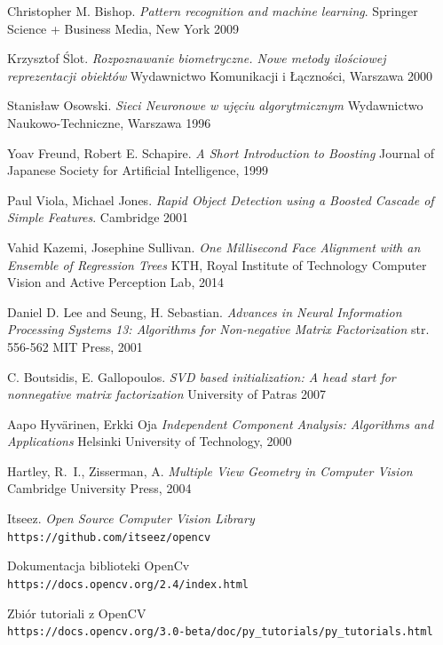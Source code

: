 \documentclass[oneside, eng]{mgr}
\begin{document}
\newpage
\begin{thebibliography}{9}

Christopher M. Bishop.
\textit{Pattern recognition and machine learning}.
Springer Science + Business Media, New York 2009

Krzysztof Ślot.
\textit{Rozpoznawanie biometryczne. Nowe metody ilościowej reprezentacji obiektów}
Wydawnictwo Komunikacji i Łączności, Warszawa 2000

Stanisław Osowski.
\textit{Sieci Neuronowe w ujęciu algorytmicznym}
Wydawnictwo Naukowo-Techniczne, Warszawa 1996

Yoav Freund, Robert E. Schapire.
\textit{A Short Introduction to Boosting}
Journal of Japanese Society for Artificial Intelligence, 1999

Paul Viola, Michael Jones.
\textit{Rapid Object Detection using a Boosted Cascade of Simple Features}.
Cambridge 2001

Vahid Kazemi, Josephine Sullivan.
\textit{One Millisecond Face Alignment with an Ensemble of Regression Trees}
KTH, Royal Institute of Technology
Computer Vision and Active Perception Lab, 2014

Daniel D. Lee and Seung, H. Sebastian.
\textit{Advances in Neural Information Processing Systems 13: Algorithms for Non-negative Matrix Factorization}
str. 556-562
MIT Press, 2001

C. Boutsidis, E. Gallopoulos.
\textit{SVD based initialization: A head start for nonnegative matrix factorization}
University of Patras 2007

Aapo Hyvärinen, Erkki Oja
\textit{Independent Component Analysis: Algorithms and Applications}
Helsinki University of Technology, 2000

Hartley, R.~I., Zisserman, A.
\textit{Multiple View Geometry in Computer Vision}
Cambridge University Press, 2004

Itseez.
\textit{Open Source Computer Vision Library}
\\\texttt{https://github.com/itseez/opencv}

Dokumentacja biblioteki OpenCv 
\\\texttt{https://docs.opencv.org/2.4/index.html}

Zbiór tutoriali z OpenCV
\\\texttt{https://docs.opencv.org/3.0-beta/doc/py\_tutorials/py\_tutorials.html}


\end{thebibliography}
\end{document}
